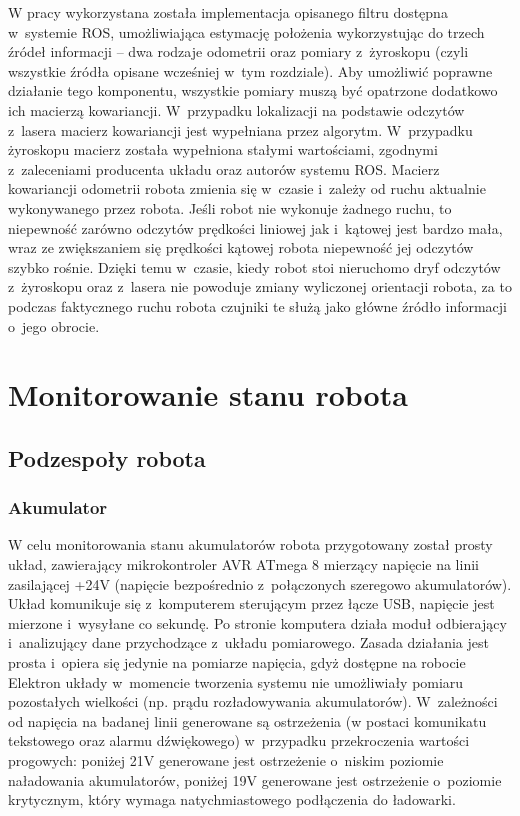 W pracy wykorzystana została implementacja opisanego filtru dostępna w~systemie ROS,
umożliwiająca estymację położenia wykorzystując do trzech źródeł informacji -- dwa rodzaje
odometrii oraz pomiary z~żyroskopu (czyli wszystkie źródła opisane wcześniej w~tym rozdziale).
Aby umożliwić poprawne działanie tego komponentu, wszystkie pomiary muszą być opatrzone
dodatkowo ich macierzą kowariancji. W~przypadku lokalizacji na podstawie odczytów z~lasera
macierz kowariancji jest wypełniana przez algorytm. W~przypadku żyroskopu macierz
została wypełniona stałymi wartościami, zgodnymi z~zaleceniami producenta układu oraz
autorów systemu ROS. Macierz kowariancji odometrii robota zmienia się w~czasie i~zależy
od ruchu aktualnie wykonywanego przez robota. Jeśli robot nie wykonuje żadnego ruchu,
to niepewność zarówno odczytów prędkości liniowej jak i~kątowej jest bardzo mała,
wraz ze zwiększaniem się prędkości kątowej robota niepewność jej odczytów szybko rośnie.
Dzięki temu w~czasie, kiedy robot stoi nieruchomo dryf odczytów z~żyroskopu oraz z~lasera
nie powoduje zmiany wyliczonej orientacji robota, za to podczas faktycznego ruchu robota
czujniki te służą jako główne źródło informacji o~jego obrocie.

\section{Monitorowanie stanu robota}

\subsection{Podzespoły robota}

\subsubsection{Akumulator}

W celu monitorowania stanu akumulatorów robota przygotowany został prosty układ,
zawierający mikrokontroler AVR ATmega 8 mierzący napięcie na linii
zasilającej +24V (napięcie bezpośrednio z~połączonych szeregowo akumulatorów).
Układ komunikuje się z~komputerem sterującym przez łącze USB, napięcie jest
mierzone i~wysyłane co sekundę. Po stronie komputera działa moduł odbierający
i~analizujący dane przychodzące z~układu pomiarowego. Zasada działania jest prosta
i~opiera się jedynie na pomiarze napięcia, gdyż dostępne na robocie Elektron
układy w~momencie tworzenia systemu nie umożliwiały pomiaru pozostałych
wielkości (np. prądu rozładowywania akumulatorów). W~zależności od napięcia na
badanej linii generowane są ostrzeżenia (w postaci komunikatu tekstowego oraz
alarmu dźwiękowego) w~przypadku przekroczenia wartości progowych: poniżej 21V
generowane jest ostrzeżenie o~niskim poziomie naładowania akumulatorów, poniżej
19V generowane jest ostrzeżenie o~poziomie krytycznym, który wymaga
natychmiastowego podłączenia do ładowarki.

